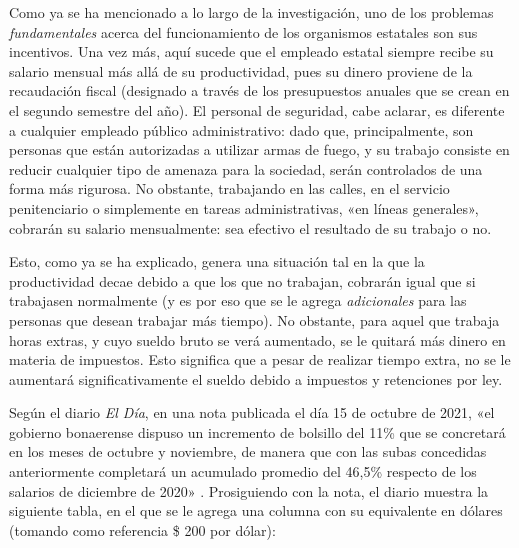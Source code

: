 \documentclass[12pt,a4paper,twoside]{book}
\begin{document}
Como ya se ha mencionado a lo largo de la investigación, uno de los problemas \textit{fundamentales} acerca del funcionamiento de los organismos estatales son sus incentivos. Una vez más, aquí sucede que el empleado estatal siempre recibe su salario mensual más allá de su productividad, pues su dinero proviene de la recaudación fiscal (designado a través de los presupuestos anuales que se crean en el segundo semestre del año). El personal de seguridad, cabe aclarar, es diferente a cualquier empleado público administrativo: dado que, principalmente, son personas que están autorizadas a utilizar armas de fuego, y su trabajo consiste en reducir cualquier tipo de amenaza para la sociedad, serán controlados de una forma más rigurosa. No obstante, trabajando en las calles, en el servicio penitenciario o simplemente en tareas administrativas, «en líneas generales», cobrarán su salario mensualmente: sea efectivo el resultado de su trabajo o no.

Esto, como ya se ha explicado, genera una situación tal en la que la productividad decae debido a que los que no trabajan, cobrarán igual que si trabajasen normalmente (y es por eso que se le agrega \textit{adicionales} para las personas que desean trabajar más tiempo). No obstante, para aquel que trabaja horas extras, y cuyo sueldo bruto se verá aumentado, se le quitará más dinero en materia de impuestos. Esto significa que a pesar de realizar tiempo extra, no se le aumentará significativamente el sueldo debido a impuestos y retenciones por ley.

Según el diario \textit{El Día}, en una nota publicada el día 15 de octubre de 2021, «el gobierno bonaerense dispuso un incremento de bolsillo del 11\% que se concretará en los meses de octubre y noviembre, de manera que con las subas concedidas anteriormente completará un acumulado promedio del 46,5\% respecto de los salarios de diciembre de 2020» \cite{aumento:policiabonaerense}. Prosiguiendo con la nota, el diario muestra la siguiente tabla, en el que se le agrega una columna con su equivalente en dólares (tomando como referencia \$ 200 por dólar):
\end{document}
